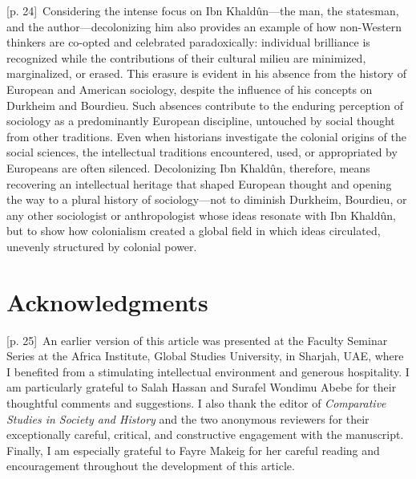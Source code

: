 \documentclass[10pt,a4paper]{article}
\begin{document}
{\scriptsize\color{gray} [p. 24]}\ Considering the intense focus on Ibn Khaldûn—the man, the statesman, and the author—decolonizing him also provides an example of how non-Western thinkers are co-opted and celebrated paradoxically: individual brilliance is recognized while the contributions of their cultural milieu are minimized, marginalized, or erased. This erasure is evident in his absence from the history of European and American sociology, despite the influence of his concepts on Durkheim and Bourdieu. Such absences contribute to the enduring perception of sociology as a predominantly European discipline, untouched by social thought from other traditions. Even when historians investigate the colonial origins of the social sciences, the intellectual traditions encountered, used, or appropriated by Europeans are often silenced. Decolonizing Ibn Khaldûn, therefore, means recovering an intellectual heritage that shaped European thought and opening the way to a plural history of sociology—not to diminish Durkheim, Bourdieu, or any other sociologist or anthropologist whose ideas resonate with Ibn Khaldûn, but to show how colonialism created a global field in which ideas circulated, unevenly structured by colonial power.\par
{}\section*{Acknowledgments}
{\scriptsize\color{gray} [p. 25]}\ An earlier version of this article was presented at the Faculty Seminar Series at the Africa Institute, Global Studies University, in Sharjah, UAE, where I benefited from a stimulating intellectual environment and generous hospitality. I am particularly grateful to Salah Hassan and Surafel Wondimu Abebe for their thoughtful comments and suggestions. I also thank the editor of \textit{Comparative Studies in Society and History} and the two anonymous reviewers for their exceptionally careful, critical, and constructive engagement with the manuscript. Finally, I am especially grateful to Fayre Makeig for her careful reading and encouragement throughout the development of this article.\par
\end{document}
